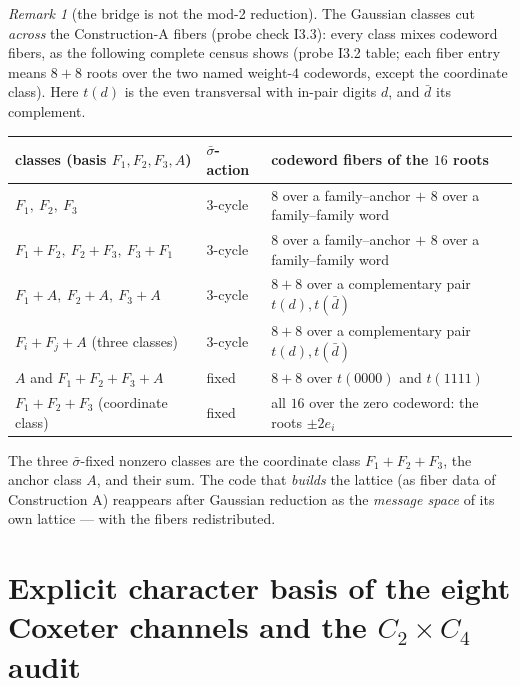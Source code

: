 \documentclass[11pt,a4paper]{article}
\theoremstyle{remark}
\newtheorem{remark}[theorem]{Remark}
\begin{document}
\begin{remark}[the bridge is not the mod-2 reduction]
\label{rem:notmod2}
The Gaussian classes cut \emph{across} the Construction-A fibers
(probe check I3.3): every class mixes codeword fibers, as the
following complete census shows (probe I3.2 table; each fiber entry
means $8+8$ roots over the two named weight-$4$ codewords, except the
coordinate class).  Here $t(d)$ is the even transversal with in-pair
digits $d$, and $\bar d$ its complement.
\begin{center}
\small
\begin{tabular}{@{}lll@{}}
\toprule
classes (basis $F_1,F_2,F_3,A$) & $\bar\sigma$-action &
codeword fibers of the $16$ roots\\
\midrule
$F_1,\ F_2,\ F_3$ & $3$-cycle &
$8$ over a family--anchor $+$ $8$ over a family--family word\\
$F_1{+}F_2,\ F_2{+}F_3,\ F_3{+}F_1$ & $3$-cycle &
$8$ over a family--anchor $+$ $8$ over a family--family word\\
$F_1{+}A,\ F_2{+}A,\ F_3{+}A$ & $3$-cycle &
$8+8$ over a complementary pair $t(d),t(\bar d)$\\
$F_i{+}F_j{+}A$ (three classes) & $3$-cycle &
$8+8$ over a complementary pair $t(d),t(\bar d)$\\
$A$ and $F_1{+}F_2{+}F_3{+}A$ & fixed &
$8+8$ over $t(0000)$ and $t(1111)$\\
$F_1{+}F_2{+}F_3$ (coordinate class) & fixed &
all $16$ over the zero codeword: the roots $\pm2e_i$\\
\bottomrule
\end{tabular}
\end{center}
The three $\bar\sigma$-fixed nonzero classes are the coordinate class
$F_1{+}F_2{+}F_3$, the anchor class $A$, and their sum.  The code
that \emph{builds} the lattice (as fiber data of Construction A)
reappears after Gaussian reduction as the \emph{message space} of its
own lattice --- with the fibers redistributed.
\end{remark}

\section{Explicit character basis of the eight Coxeter channels
and the \texorpdfstring{$C_2\times C_4$}{C2 x C4} audit}\label{sec:coxeter-chars}
\end{document}
